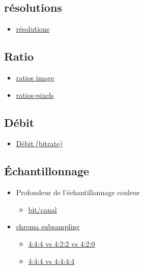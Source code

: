 \documentclass[
]{book}
\providecommand{\tightlist}{%
  \setlength{\itemsep}{0pt}\setlength{\parskip}{0pt}}
\begin{document}
\hypertarget{ruxe9solutions}{%
\subsection{résolutions}\label{ruxe9solutions}}

\begin{itemize}
\tightlist
\item
  \href{https://en.wikipedia.org/wiki/Computer_display_standard\#/media/File:Vector_Video_Standards2.svg}{résolutions}
\end{itemize}

\hypertarget{ratio}{%
\subsection{Ratio}\label{ratio}}

\begin{itemize}
\tightlist
\item
  \href{https://en.wikipedia.org/wiki/Display_aspect_ratio}{ratios image}
\item
  \href{https://en.wikipedia.org/wiki/Pixel_aspect_ratio}{ratios-pixels}
\end{itemize}

\hypertarget{duxe9bit}{%
\subsection{Débit}\label{duxe9bit}}

\begin{itemize}
\tightlist
\item
  \href{https://en.wikipedia.org/wiki/Bit_rate\#Video}{Débit (bitrate)}
\end{itemize}

\hypertarget{uxe9chantillonnage}{%
\subsection{Échantillonnage}\label{uxe9chantillonnage}}

\begin{itemize}
\tightlist
\item
  Profondeur de l'échantillonnage couleur

  \begin{itemize}
  \tightlist
  \item
    \href{https://en.wikipedia.org/wiki/Color_depth}{bit/canal}\\
  \end{itemize}
\item
  \href{https://en.wikipedia.org/wiki/Chroma_subsampling\#Sampling_systems_and_ratios}{chroma subsampling}

  \begin{itemize}
  \tightlist
  \item
    \href{https://upload.wikimedia.org/wikipedia/commons/0/06/Colorcomp.jpg}{4:4:4 vs 4:2:2 vs 4:2:0}
  \item
    \href{https://en.wikipedia.org/wiki/Alpha_compositing}{4:4:4 vs 4:4:4:4}
  \end{itemize}
\end{itemize}
\end{document}
